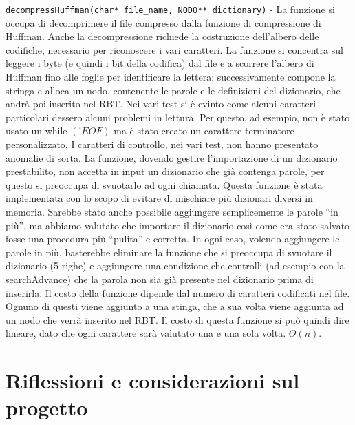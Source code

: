 \documentclass[paper=a4, fontsize=11pt,twoside]{scrartcl}   %
\begin{document}
				\texttt{decompressHuffman(char* file\_name, NODO** dictionary)} - La funzione si occupa di decomprimere il file compresso dalla funzione di compressione di Huffman. Anche la decompressione richiede la costruzione dell’albero delle codifiche, necessario per riconoscere i vari caratteri. La funzione si concentra sul leggere i byte (e quindi i bit della codifica) dal file e a scorrere l’albero di Huffman fino alle foglie per identificare la lettera; successivamente compone la stringa e alloca un nodo, contenente le parole e le definizioni del dizionario, che andrà poi inserito nel RBT. Nei vari test si è evinto come alcuni caratteri particolari dessero alcuni problemi in lettura. Per questo, ad esempio, non è stato usato un while $(!EOF)$ ma è stato creato un carattere terminatore personalizzato. I caratteri di controllo, nei vari test, non hanno presentato anomalie di sorta. La funzione, dovendo gestire l’importazione di un dizionario prestabilito, non accetta in input un dizionario che già contenga parole, per questo si preoccupa di svuotarlo ad ogni chiamata. Questa funzione è stata implementata con lo scopo di evitare di mischiare più dizionari diversi in memoria. Sarebbe stato anche possibile aggiungere semplicemente le parole “in più”, ma abbiamo valutato che importare il dizionario così come era stato salvato fosse una procedura più “pulita” e corretta. In ogni caso, volendo aggiungere le parole in più, basterebbe eliminare la funzione che si preoccupa di svuotare il dizionario (5 righe) e aggiungere una condizione che controlli (ad esempio con la searchAdvance) che la parola non sia già presente nel dizionario prima di inserirla. Il costo della funzione dipende dal numero di caratteri codificati nel file. Ognuno di questi viene aggiunto a una stinga, che a sua volta viene aggiunta ad un nodo che verrà inserito nel RBT. Il costo di questa funzione si può quindi dire lineare, dato che ogni carattere sarà valutato una e una sola volta. $\Theta(n)$.
			\pagebreak
		\section{Riflessioni e considerazioni sul progetto}
\end{document}
